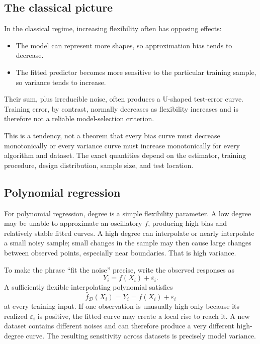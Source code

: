 \documentclass[11pt,a4paper]{article}
\begin{document}
\subsection{The classical picture}

In the classical regime, increasing flexibility often has opposing effects:
\begin{itemize}
  \item The model can represent more shapes, so approximation bias tends to decrease.
  \item The fitted predictor becomes more sensitive to the particular training sample, so variance tends to increase.
\end{itemize}
Their sum, plus irreducible noise, often produces a U-shaped test-error curve. Training error, by contrast, normally decreases as flexibility increases and is therefore not a reliable model-selection criterion.

This is a tendency, not a theorem that every bias curve must decrease monotonically or every variance curve must increase monotonically for every algorithm and dataset. The exact quantities depend on the estimator, training procedure, design distribution, sample size, and test location.

\subsection{Polynomial regression}

For polynomial regression, degree is a simple flexibility parameter. A low degree may be unable to approximate an oscillatory $f$, producing high bias and relatively stable fitted curves. A high degree can interpolate or nearly interpolate a small noisy sample; small changes in the sample may then cause large changes between observed points, especially near boundaries. That is high variance.

To make the phrase ``fit the noise'' precise, write the observed responses as
\begin{equation}
  Y_i=f(X_i)+\varepsilon_i.
\end{equation}
A sufficiently flexible interpolating polynomial satisfies
\begin{equation}
  \widehat f_{\mathcal D}(X_i)=Y_i=f(X_i)+\varepsilon_i
\end{equation}
at every training input. If one observation is unusually high only because its realized $\varepsilon_i$ is positive, the fitted curve may create a local rise to reach it. A new dataset contains different noises and can therefore produce a very different high-degree curve. The resulting sensitivity across datasets is precisely model variance.
\end{document}
